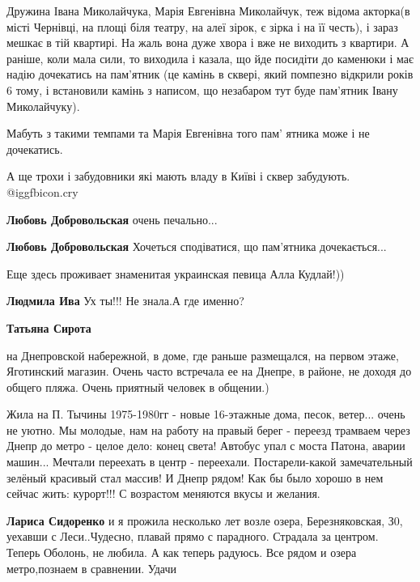 \begin{itemize}
\begin{itemize}
\end{itemize} %


Дружина Івана Миколайчука, Марія Евгенівна Миколайчук, теж відома акторка(в
місті Чернівці, на площі біля театру, на алеї зірок, є зірка і на її честь), і
зараз мешкає в тій квартирі. На жаль вона дуже хвора і вже не виходить з
квартири. А раніше, коли мала сили, то виходила і казала, що йде посидіти до
каменюки і має надію дочекатись на пам'ятник (це камінь в сквері, який помпезно
відкрили років 6 тому, і встановили камінь з написом, що незабаром тут буде
пам'ятник Івану Миколайчуку).

Мабуть з такими темпами та Марія Евгенівна того пам' ятника може і не
дочекатись.

А ще трохи і забудовники які мають владу в Київі і сквер забудують.  @igg{fbicon.cry} 

\begin{itemize} %
\textbf{Любовь Добровольская} очень печально...

\textbf{Любовь Добровольская} Хочеться сподіватися, що пам'ятника дочекається...
\end{itemize} %

Еще здесь проживает знаменитая украинская певица Алла Кудлай!))

\begin{itemize} %
\textbf{Людмила Ива} Ух ты!!! Не знала.А где именно?

\textbf{Татьяна Сирота} 

на Днепровской набережной, в доме, где раньше размещался, на первом этаже,
Яготинский магазин. Очень часто встречала ее на Днепре, в районе, не доходя до
общего пляжа. Очень приятный человек в общении.)

\end{itemize} %


Жила на П. Тычины 1975-1980гг - новые 16-этажные дома, песок, ветер... очень не
уютно. Мы молодые, нам на работу на правый берег - переезд трамваем через Днепр до
метро - целое дело: конец света! Автобус упал с моста Патона, аварии машин... Мечтали
переехать в центр - переехали. Постарели-какой замечательный зелёный красивый
стал массив! И Днепр рядом! Как бы было хорошо в нем сейчас жить: курорт!!! С
возрастом меняются вкусы и желания.

\begin{itemize} %
\textbf{Лариса Сидоренко} и я прожила несколько лет возле озера, Березняковская, З0, уехавши с Леси..Чудесно, плавай прямо с парадного. Страдала за центром. Теперь Оболонь, не любила. А как теперь радуюсь. Все рядом и озера метро,познаем в сравнении. Удачи
\end{itemize} %


\end{itemize}

